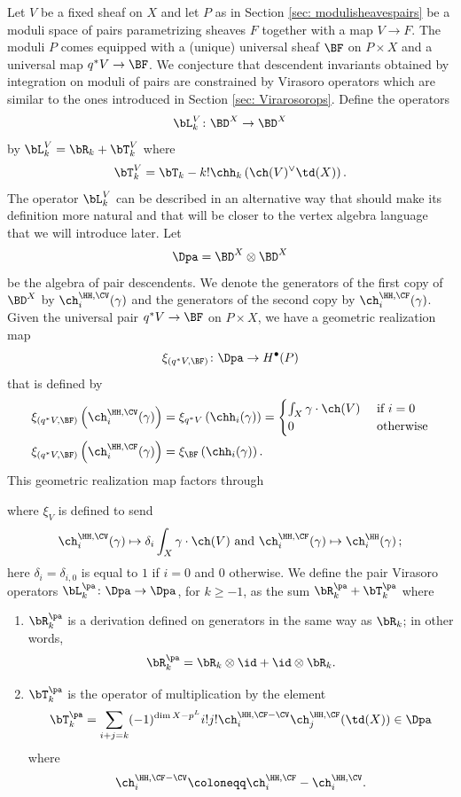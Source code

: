 Let $V$ be a fixed sheaf on $X$ and let $P$ as in  Section \ref{sec: modulisheavespairs} be a moduli space of pairs parametrizing sheaves $F$ together with a map $V\to F$. The moduli $P$ comes equipped with a (unique) universal sheaf $\BF$ on $P\times X$ and a universal map $q^\ast V\to \BF$. We conjecture that descendent invariants obtained by integration on moduli of pairs are constrained by Virasoro operators which are similar to the ones introduced in Section \ref{sec: Virarosorops}. Define the operators
\[\bL_k^V\colon \BD^X\to \BD^X\]
by $\bL_k^V=\bR_k+\bT_k^V$ where
\[\bT_k^V=\bT_k-k!\chh_k\left(\ch(V)^\vee\td(X)\right).\]
The operator $\bL_k^V$ can be described in an alternative way that should make its definition more natural and that will be closer to the vertex algebra language that we will introduce later. Let
\[\Dpa=\BD^X\otimes\BD^X\]
be the algebra of pair descendents. We denote the generators of the first copy of $\BD^X$ by  $\ch_i^{\HH, \CV}(\gamma)$ and the generators of the second copy by  $\ch_i^{\HH, \CF}(\gamma)$. Given the universal pair $q^\ast V\to \BF$ on $P\times X$, we have a geometric realization map
\[\xi_{(q^\ast V,\BF)}\colon \Dpa\to H^\bullet(P)\]
that is defined by
\begin{align*}\xi_{(q^\ast V, \BF)}\left(\ch_i^{\HH, \CV}(\gamma)\right)&=\xi_{q^\ast V}\left(\chh_i(\gamma)\right)=\begin{cases}\int_X \gamma\cdot \ch(V)&\textup{ if }i=0\\
0 & \textup{ otherwise}\end{cases}\\
\xi_{( q^\ast V, \BF)}\left(\ch_i^{\HH, \CF}(\gamma)\right)&=\xi_{\BF}\left(\chh_i(\gamma)\right).
\end{align*}
This geometric realization map factors through


where $\xi_{V}$ is defined to send
\[\ch_i^{\HH, \CV}(\gamma)\mapsto \delta_i \int_X \gamma\cdot \ch(V)\textup{ and }\ch_i^{\HH, \CF}(\gamma)\mapsto \ch_i^{\HH}(\gamma)\,;\]
here $\delta_i=\delta_{i,0}$ is equal to $1$ if $i=0$ and $0$ otherwise.
We define the pair Virasoro operators $\bL_k^{\pa}\colon \Dpa\to \Dpa$, for $k\geq -1$, as the sum $\bR_k^{\pa}+\bT_k^{\pa}$ where
\begin{enumerate}
\item $\bR_k^{\pa}$ is a derivation defined on generators in the same way as $\bR_k$; in other words,
\[\bR_k^{\pa}=\bR_k\otimes \id+\id\otimes \bR_k.\]
\item $\bT_k^{\pa}$ is the operator of multiplication by the element
\[\bT_k^{\pa}=\sum_{i+j=k} (-1)^{\dim X- p^L}i!j!\ch_i^{\HH, \CF-\CV}\ch_j^{\HH, \CF}(\td(X))\in \Dpa\]
where
\[\ch_i^{\HH, \CF-\CV}\coloneqq \ch_i^{\HH, \CF}-\ch_i^{\HH, \CV}.\]
\end{enumerate}



